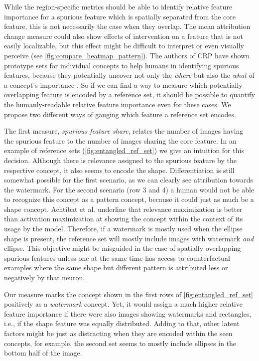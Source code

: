While the region-specific metrics should be able to identify relative feature importance for a spurious feature which is spatially separated from the core feature, this is not necessarily the case when they overlap. The mean attribution change measure could also show effects of intervention on a feature that is not easily localizable, but this effect might be difficult to interpret or even visually perceive (see \cref{fig:compare_heatmap_pattern}). The authors of CRP have shown prototype sets for individual concepts to help humans in identifying spurious features, because they potentially uncover not only the \textit{where} but also the \textit{what} of a concept's importance \cite{Achtibat2023}. So if we can find a way to measure which potentially overlapping feature is encoded by a reference set, it should be possible to quantify the humanly-readable relative feature importance even for these cases. 
We propose two different ways of gauging which feature a reference set encodes. 

The first measure, \textit{spurious feature share}, relates the number of images having the spurious feature to the number of images sharing the core feature. In an example of reference sets (\cref{fig:entangled_ref_set}) we give an intuition for this decision. Although there is relevance assigned to the spurious feature by the respective concept, it also seems to encode the shape. Differentiation is still somewhat possible for the first scenario, as we can clearly see attribution towards the watermark. For the second scenario (row 3 and 4) a human would not be able to recognize this concept as a pattern concept, because it could just as much be a shape concept. 
Achtibat et al. underline that relevance maximization is better than activation maximization at showing the concept within the context of its usage by the model. Therefore, if a watermark is mostly used when the ellipse shape is present, the reference set will mostly include images with watermark \textit{and} ellipse. This objective might be misguided in the case of spatially overlapping spurious features unless one at the same time has access to counterfactual examples where the same shape but different pattern is attributed less or negatively by that neuron. 

Our measure marks the concept shown in the first rows of \cref{fig:entangled_ref_set} positively as a \textit{watermark} concept. Yet, it would assign a much higher relative feature importance if there were also images showing watermarks and rectangles, i.e., if the shape feature was equally distributed. Adding to that, other latent factors might be just as distracting when they are encoded within the seen concepts, for example, the second set seems to mostly include ellipses in the bottom half of the image.

